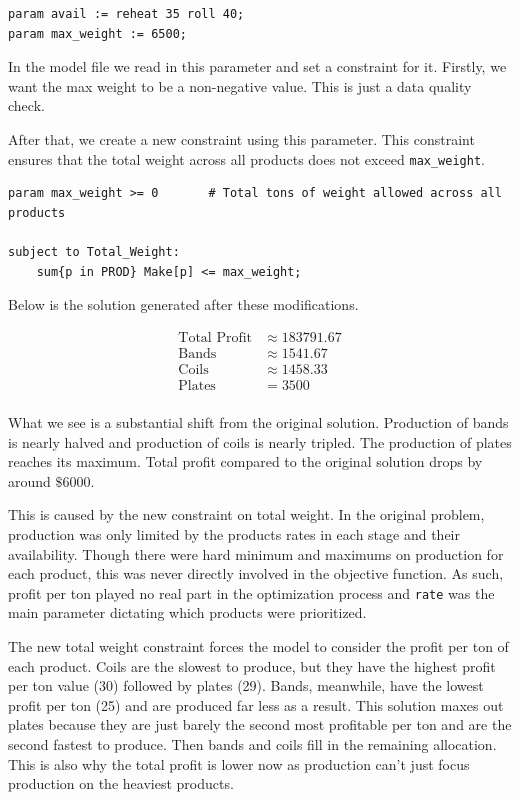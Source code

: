 \begin{lstlisting}
param avail := reheat 35 roll 40;
param max_weight := 6500; 
\end{lstlisting}

In the model file we read in this parameter and set a constraint for it. Firstly, we want the max weight to be a non-negative value. This is just a data quality check. 

After that, we create a new constraint using this parameter. This constraint ensures that the total weight across all products does not exceed \texttt{max\_weight}. 

\begin{lstlisting}
param max_weight >= 0		# Total tons of weight allowed across all products

subject to Total_Weight:
	sum{p in PROD} Make[p] <= max_weight;
\end{lstlisting}

Below is the solution generated after these modifications. 

\begin{align*}
	\text{Total Profit} &\approx 183791.67 \\
	\text{Bands} &\approx 1541.67 \\
	\text{Coils} &\approx 1458.33 \\
	\text{Plates} &= 3500 \\
\end{align*}

What we see is a substantial shift from the original solution. Production of bands is nearly halved and production of coils is nearly tripled. The production of plates reaches its maximum. Total profit compared to the original solution drops by around $\$6000$.

This is caused by the new constraint on total weight. In the original problem, production was only limited by the products rates in each stage and their availability. Though there were hard minimum and maximums on production for each product, this was never directly involved in the objective function. As such, profit per ton played no real part in the optimization process and \texttt{rate} was the main parameter dictating which products were prioritized.

The new total weight constraint forces the model to consider the profit per ton of each product. Coils are the slowest to produce, but they have the highest profit per ton value (30) followed by plates (29). Bands, meanwhile, have the lowest profit per ton (25) and are produced far less as a result. This solution maxes out plates because they are just barely the second most profitable per ton and are the second fastest to produce. Then bands and coils fill in the remaining allocation. This is also why the total profit is lower now as production can't just focus production on the heaviest products. 

